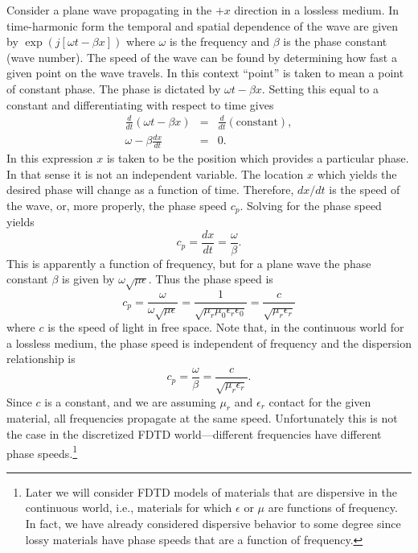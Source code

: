 Consider a plane wave propagating in the $+x$ direction in a
lossless medium.  In time-harmonic form the temporal and spatial
dependence of the wave are given by $\exp(j[\omega t-\beta x])$ where
$\omega$ is the frequency and $\beta$ is the phase constant (wave number).
The speed of the wave can be found by determining how fast a given
point on the wave travels.  In this context ``point'' is taken to mean
a point of constant phase.  The phase is dictated by $\omega t - \beta x$.
Setting this equal to a constant and differentiating with respect to
time gives
\begin{eqnarray}
  \frac{d}{dt}(\omega t-\beta x) &=& \frac{d}{dt}(\mbox{constant}), \\
  \omega - \beta \frac{dx}{dt} &=& 0. \label{eq:phase}
\end{eqnarray}
In this expression $x$ is taken to be the position which provides a
particular phase.  In that sense it is not an independent variable.
The location $x$ which yields the desired phase will change as a
function of time.  Therefore, $dx/dt$ is the speed of the wave, or,
more properly, the phase speed $c_p$.  Solving  for the
phase speed yields
\begin{equation}
  c_p = \frac{dx}{dt} = \frac{\omega}{\beta}.
\end{equation}
This is apparently a function of frequency, but for a plane wave the
phase constant $\beta$ is given by $\omega\sqrt{\mu\epsilon}$.  Thus
the phase speed is
\begin{equation}
  c_p = \frac{\omega}{\omega\sqrt{\mu\epsilon}} 
  = \frac{1}{\sqrt{\mu_r\mu_0\epsilon_r\epsilon_0}} 
  = \frac{c}{\sqrt{\mu_r\epsilon_r}}
\end{equation}
where $c$ is the speed of light in free space.  Note that, in the
continuous world for a lossless medium, the phase speed is independent
of frequency and the dispersion relationship is
\begin{equation}
 c_p = \frac{\omega}{\beta} = \frac{c}{\sqrt{\mu_r\epsilon_r}}.
 \label{eq:dispExact1D} 
\end{equation}
Since $c$ is a constant, and we are assuming $\mu_r$ and $\epsilon_r$
contact for the given material, all frequencies propagate at the same
speed.  Unfortunately this is not the case in the discretized FDTD
world---different frequencies have different phase
speeds.\footnote{Later we will consider FDTD models of materials that
  are dispersive in the continuous world, i.e., materials for which
  $\epsilon$ or $\mu$ are functions of frequency.  In fact, we have
  already considered dispersive behavior to some degree since lossy
  materials have phase speeds that are a function of frequency.}

